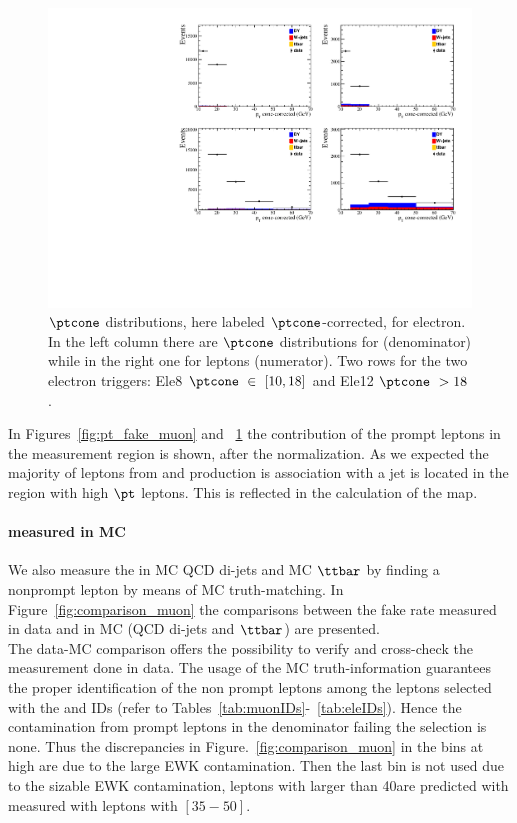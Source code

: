 \begin{figure}[h!]
\centering
\includegraphics[width=.7\textwidth]{Figures/c5/FAKE/pt_cone_ele.pdf}
\caption{$\ptcone$ distributions, here labeled $\ptcone$-corrected,
  for electron. In the left column there are $\ptcone$ distributions
  for \fo  (denominator) while in the
  right one for \ti  leptons (numerator). Two
  rows for the two electron triggers: Ele8 $\ptcone \ \in \ [10,18]$\GeV
  and Ele12 $\ptcone \ > 18$\GeV.}
\label{fig:pt_fake_ele}
\end{figure}

In Figures~\ref{fig:pt_fake_muon} and ~\ref{fig:pt_fake_ele} 
the contribution of the prompt leptons in the measurement region is shown, after
the normalization. As we expected the majority of leptons from \PW and
\PZ production is association with a jet is located in the region with
high $\pt$ leptons. This is
reflected in the calculation of the \fr map.

\paragraph{\fr measured in MC}
We also measure the \fr in MC QCD di-jets and MC $\ttbar$ by
finding a nonprompt lepton by means of MC truth-matching. In
Figure~\ref{fig:comparison_muon} the comparisons between the fake rate
measured in data and in MC (QCD di-jets and $\ttbar$)  are
presented.\\
The data-MC comparison offers the possibility to verify and cross-check the
measurement done in data. The usage of the MC truth-information
guarantees the proper identification of the non prompt leptons among
the leptons selected with the \fo and \ti  IDs (refer to
Tables~\ref{tab:muonIDs}-~\ref{tab:eleIDs}). Hence the contamination
from prompt leptons in the denominator failing the \ti  selection is
none. Thus the discrepancies in Figure.~\ref{fig:comparison_muon} in the
bins at high \pt are due to the large EWK contamination. Then the last
bin is not used due to the sizable EWK contamination, leptons with \pt
larger than 40\GeV are predicted with \fr measured with leptons
with \pt $[35-50]$\GeV.


